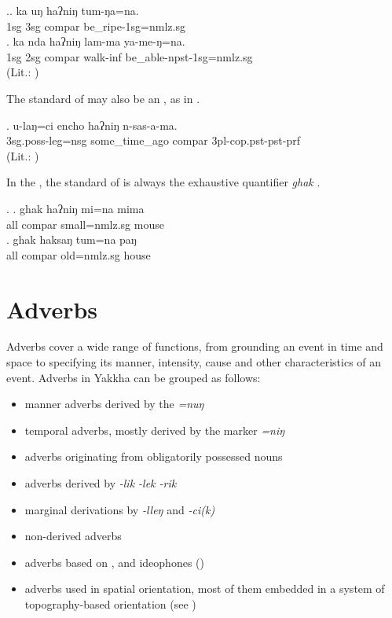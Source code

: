 \ex.\ag. ka uŋ haʔniŋ  tum-ŋa=na.\\
			{\sc 1sg} {\sc 3sg}  {\sc compar} be\_ripe-{\sc 1sg=nmlz.sg}	\\
	 \bg.  ka nda haʔniŋ lam-ma ya-me-ŋ=na.\\
			{\sc 1sg} {\sc 2sg}  {\sc compar}  walk{\sc -inf} be\_able{\sc -npst-1sg=nmlz.sg}\\
	 (Lit.: )
	
The standard of  may also be an , as in \Next. 

\exg. u-laŋ=ci encho haʔniŋ n-sas-a-ma.\\
		{\sc 3sg.poss}-leg{\sc =nsg} some\_time\_ago {\sc compar} {\sc 3pl-cop.pst-pst-prf}\\
	 (Lit.: )

In the , the standard of  is always the exhaustive quantifier \emph{ghak}  \Next. 

\ex. \ag. ghak haʔniŋ mi=na  mima\\
	all {\sc compar} small{\sc =nmlz.sg} mouse\\
 
\bg. ghak haksaŋ tum=na  paŋ\\
all  {\sc compar} old{\sc =nmlz.sg} house\\
 


\section{Adverbs}\label{adv}

Adverbs cover a wide range of functions, from grounding an event in time and space to specifying its manner, intensity, cause and other characteristics of an event. Adverbs in Yakkha can be grouped as follows:

\begin{itemize}
\item manner adverbs derived by the  \emph{=nuŋ}
\item temporal adverbs, mostly derived by the  marker  \emph{=niŋ} 
\item adverbs originating from obligatorily possessed nouns
\item adverbs derived by \emph{-lik \ti -lek \ti -rik}
\item marginal derivations by \emph{-lleŋ} and \emph{-ci(k)}
\item non-derived adverbs
\item adverbs based on ,  and ideophones ()
\item adverbs used in spatial orientation, most of them embedded in a system of topography-based orientation (see )
\end{itemize}

